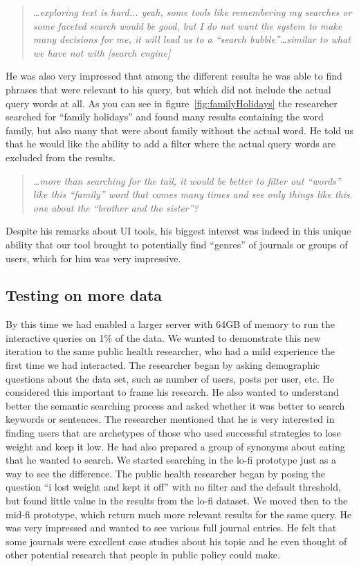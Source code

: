 \documentclass{sigchi}
\begin{document}
\begin{quote}
{\em
\dots exploring text is hard... yeah, some tools like remembering my searches or some faceted search would be good, but I do not want the system to make many decisions for me, it will lead us to a ``search bubble''\dots similar to what we have not with [search engine]
}\end{quote}

He was also very impressed that among the different results he was able to find phrases that were relevant to his query, but which did not include the actual query words at all. As you can see in figure~\ref{fig:familyHolidays} the researcher searched for ``family holidays'' and found many results containing the word family, but also many that were about family without the actual word. He told us that he would like the ability to add a filter where the actual query words are excluded from the results.

\begin{quote}
{\em
\dots more than searching for the tail, it would be better to filter out ``words'' like this ``family'' word that comes many times and see only things like this one about the ``brother and the sister''?
}\end{quote}

Despite his remarks about UI tools, his biggest interest was indeed in this unique ability that our tool brought to potentially find ``genres'' of journals or groups of users, which for him was very impressive.

\subsection{Testing on more data}

By this time we had enabled a larger server with  64GB of memory to run the interactive queries on 1\% of the data. We wanted to demonstrate this new iteration to the same public health researcher, who had a mild experience the first time we had interacted. 
The researcher began by asking demographic questions about the data set, such as number of users, posts per user, etc. He considered this important to frame his research. He also wanted to understand better the semantic searching process and asked whether it was better to search keywords or sentences. The researcher mentioned that he is very interested in finding users that are archetypes of those who used successful strategies to lose weight and keep it low. He had also prepared a group of synonyms about eating that he wanted to search. We started searching in the lo-fi prototype just as a way to see the difference. The public health researcher began by posing the question ``i lost weight and kept it off'' with no filter and the default threshold, but found little value in the results from the lo-fi dataset. We moved then to the mid-fi prototype, which return much more relevant results for the same query. He was very impressed and wanted to see various full journal entries. He felt that some journals were excellent case studies about his topic and he even thought of other potential research that people in public policy could make. 
\end{document}
